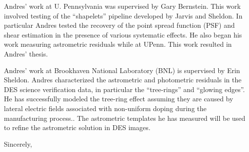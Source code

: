 \documentclass[12pt]{letter}
\begin{document}
\begin{letter}{}
Andres' work at U. Pennsylvania was supervised by Gary Bernstein.  This work
involved testing of the ``shapelets'' pipeline developed by Jarvis and Sheldon.
In particular Andres tested the recovery of the point spread function (PSF) and
shear estimation in the presence of various systematic effects.  He also began
his work measuring astrometric residuals while at UPenn.  This work resulted
in Andres' thesis.

Andres' work at Brookhaven National Laboratory (BNL) is supervised by Erin
Sheldon.  Andres characterized the astrometric and photometric residuals in
the DES science verification data, in particular the ``tree-rings'' and
``glowing edges''. He has successfully modeled the tree-ring effect
assuming they are caused by lateral electric fields associated with non-uniform
doping during the manufacturing
process.\cite{PlazasProceedings2014,Plazas2014}.  The astrometric templates he
has measured will be used to refine the astrometric solution in DES images.


\closing{Sincerely, }






\end{letter}
\end{document}
